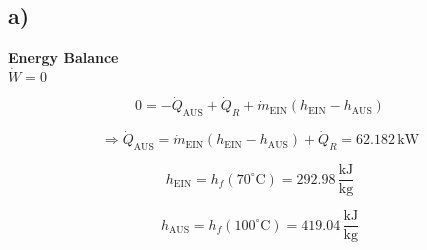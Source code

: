 

\subsection*{a)}
\textbf{Energy Balance} \\
$\dot{W} = 0$

\[
0 = -\dot{Q}_{\text{AUS}} + \dot{Q}_R + \dot{m}_{\text{EIN}} \left( h_{\text{EIN}} - h_{\text{AUS}} \right)
\]

\[
\Rightarrow \dot{Q}_{\text{AUS}} = \dot{m}_{\text{EIN}} \left( h_{\text{EIN}} - h_{\text{AUS}} \right) + \dot{Q}_R = 62.182 \, \text{kW}
\]

\[
h_{\text{EIN}} = h_f(70^\circ \text{C}) = 292.98 \, \frac{\text{kJ}}{\text{kg}}
\]

\[
h_{\text{AUS}} = h_f(100^\circ \text{C}) = 419.04 \, \frac{\text{kJ}}{\text{kg}}
\]